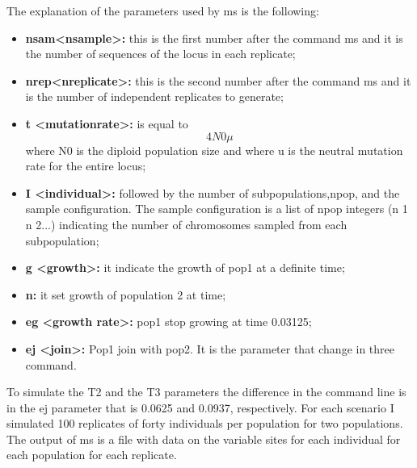 
The explanation of the parameters used by ms is the following:

\begin{itemize}
\item\textbf{nsam<nsample>:} this is the first number after the command ms and it is the number of sequences of the locus in each replicate; 

\item\textbf{nrep<nreplicate>:} this is the second number after the command ms and it is the number of independent replicates to generate;

\item\textbf{t <mutationrate>:}
is equal to $$4N0\mu$$ where N0 is the diploid population size and where u is the neutral mutation rate for the entire locus;

\item\textbf{I <individual>:}
followed by the number of subpopulations,npop, and the sample configuration. The sample configuration is a list of npop integers (n 1 n 2...) indicating the number of chromosomes sampled from each subpopulation;

\item\textbf{g <growth>:}
 it indicate the growth of pop1 at a definite time;

\item\textbf{n:}
it set growth of population 2 at time; 

\item\textbf{eg <growth rate>:}
pop1 stop growing at time 0.03125;

\item\textbf{ej <join>:}
Pop1 join with pop2. It is the parameter that change in three command. 
\end{itemize}

To simulate the T2 and the T3 parameters the difference in the command line is in the ej parameter that is 0.0625 and 0.0937, respectively. For each scenario I simulated 100 replicates of forty individuals per population for two populations. The output of ms is a file with data on the variable sites for each individual for each population for each replicate. 


